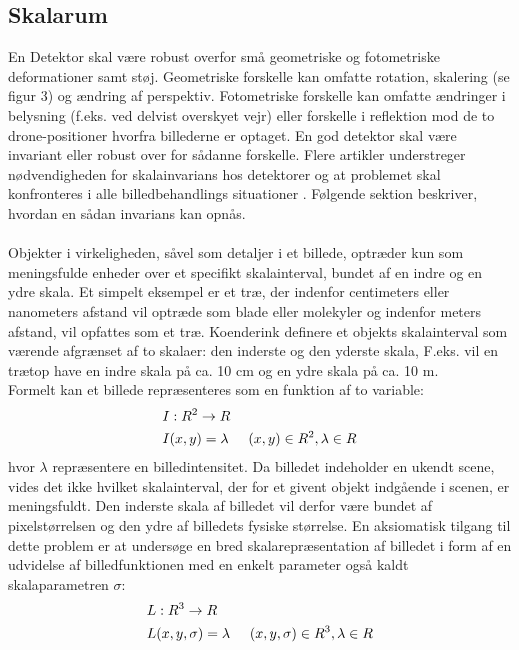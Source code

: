 \subsection{Skalarum}
En Detektor skal være robust overfor små geometriske og fotometriske deformationer samt støj. Geometriske forskelle kan omfatte rotation, skalering (se figur 3) og ændring af perspektiv.  Fotometriske forskelle kan omfatte ændringer i belysning (f.eks. ved delvist overskyet vejr) eller forskelle i reflektion mod de to drone-positioner hvorfra billederne er optaget. En god detektor skal være invariant eller robust over for sådanne forskelle.  Flere artikler understreger nødvendigheden for skalainvarians hos detektorer og at problemet skal konfronteres i alle billedbehandlings situationer \cite{koen} \cite{blob} \cite{lindenscale}. Følgende sektion beskriver, hvordan en sådan invarians kan opnås. \\ \\
Objekter i virkeligheden, såvel som detaljer i et billede, optræder kun som meningsfulde enheder over et specifikt skalainterval, bundet af en indre og en ydre skala. Et simpelt eksempel er et træ, der indenfor centimeters eller nanometers afstand vil optræde som blade eller molekyler og indenfor meters afstand, vil opfattes som et træ. Koenderink \cite{koen} definere et objekts skalainterval som værende afgrænset af to skalaer: den inderste og den yderste skala,  F.eks. vil en trætop have en indre skala på ca. 10 cm og en ydre skala på ca. 10 m. 
\\
Formelt kan et billede repræsenteres som en funktion af to variable:
\begin{equation}
\begin{split}
&I: R^2 \rightarrow R \\
&I(x,y) = \lambda \hspace{0.5 cm} (x,y)\in R^2, \lambda \in R
\end{split}
\end{equation}
hvor $\lambda$ repræsentere en billedintensitet. Da billedet indeholder en ukendt scene, vides det ikke hvilket skalainterval, der for et givent objekt indgående i scenen, er meningsfuldt. Den inderste skala af billedet vil derfor være bundet af pixelstørrelsen og den ydre af billedets fysiske størrelse. En aksiomatisk tilgang til dette problem er at undersøge en bred skalarepræsentation af billedet i form af en udvidelse af billedfunktionen med en enkelt parameter også kaldt skalaparametren $\sigma$:
\begin{equation}
\begin{split}
&L: R^3 \rightarrow R \\
&L(x,y,\sigma) = \lambda \hspace{0.5 cm} (x,y,\sigma)\in R^3, \lambda \in R
\end{split}
\end{equation}
